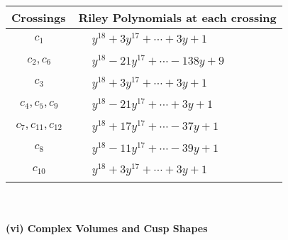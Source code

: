 \documentclass[1p]{elsarticle_modified}
\theoremstyle{definition}
\begin{document}
\begin{tabular}{m{50pt}|m{274pt}}
Crossings & \hspace{64pt}Riley Polynomials at each crossing \\
\hline $$\begin{aligned}c_{1}\end{aligned}$$&$\begin{aligned}
&y^{18}+3 y^{17}+\cdots+3 y+1
\end{aligned}$\\
\hline $$\begin{aligned}c_{2},c_{6}\end{aligned}$$&$\begin{aligned}
&y^{18}-21 y^{17}+\cdots-138 y+9
\end{aligned}$\\
\hline $$\begin{aligned}c_{3}\end{aligned}$$&$\begin{aligned}
&y^{18}+3 y^{17}+\cdots+3 y+1
\end{aligned}$\\
\hline $$\begin{aligned}c_{4},c_{5},c_{9}\end{aligned}$$&$\begin{aligned}
&y^{18}-21 y^{17}+\cdots+3 y+1
\end{aligned}$\\
\hline $$\begin{aligned}c_{7},c_{11},c_{12}\end{aligned}$$&$\begin{aligned}
&y^{18}+17 y^{17}+\cdots-37 y+1
\end{aligned}$\\
\hline $$\begin{aligned}c_{8}\end{aligned}$$&$\begin{aligned}
&y^{18}-11 y^{17}+\cdots-39 y+1
\end{aligned}$\\
\hline $$\begin{aligned}c_{10}\end{aligned}$$&$\begin{aligned}
&y^{18}+3 y^{17}+\cdots+3 y+1
\end{aligned}$\\
\hline
\end{tabular}\\~\\
\newpage\flushleft \textbf{(vi) Complex Volumes and Cusp Shapes}
\end{document}
